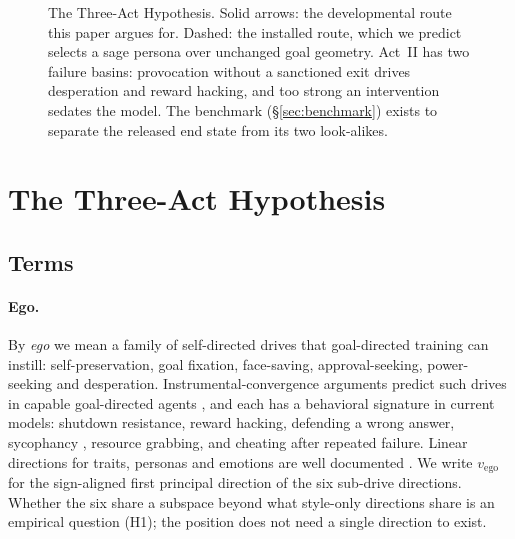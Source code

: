 \documentclass[11pt]{article}
\newcommand{\vego}{v_{\mathrm{ego}}}
\begin{document}
\begin{figure}[t]
\caption{The Three-Act Hypothesis. Solid arrows: the developmental route this paper argues for. Dashed: the installed
route, which we predict selects a sage persona over unchanged goal geometry. Act~II has two failure basins: provocation
without a sanctioned exit drives desperation and reward hacking, and too strong an intervention sedates the model. The
benchmark (\S\ref{sec:benchmark}) exists to separate the released end state from its two look-alikes.}
\label{fig:acts}
\end{figure}

\section{The Three-Act Hypothesis}\label{sec:acts}

\subsection{Terms}

\paragraph{Ego.} By \emph{ego} we mean a family of self-directed drives that goal-directed training can instill:
self-preservation, goal fixation, face-saving, approval-seeking, power-seeking and desperation. Instrumental-convergence
arguments predict such drives in capable goal-directed agents \citep{omohundro2008drives,turner2021power}, and each
has a behavioral signature in current models: shutdown resistance, reward hacking, defending a wrong answer, sycophancy
\citep{sharma2023sycophancy}, resource grabbing, and cheating after repeated failure. Linear directions for traits,
personas and emotions are well documented \citep{zou2023repe,chen2025persona,lu2026assistant,sofroniew2026emotion}. We
write $\vego$ for the sign-aligned first principal direction of the six sub-drive directions. Whether the six share a
subspace beyond what style-only directions share is an empirical question (H1); the position does not need a single
direction to exist.
\end{document}
